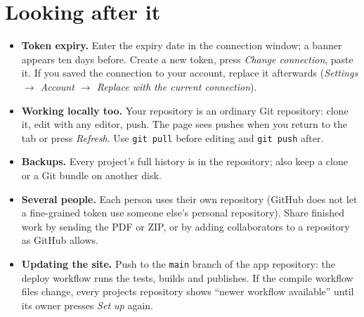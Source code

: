 \documentclass[11pt,a4paper]{article}
\newcommand{\fpath}[1]{\texttt{\small #1}}
\begin{document}
\section{Looking after it}
\begin{itemize}
  \item \textbf{Token expiry.} Enter the expiry date in the connection window; a banner appears ten days before. Create a new token, press \emph{Change connection}, paste it. If you saved the connection to
        your account, replace it afterwards (\emph{Settings $\rightarrow$ Account $\rightarrow$ Replace with the current connection}).
  \item \textbf{Working locally too.} Your repository is an ordinary Git repository: clone it, edit with any editor, push. The page sees pushes when you return to the tab or press \emph{Refresh}.
        Use \fpath{git pull} before editing and \fpath{git push} after.
  \item \textbf{Backups.} Every project's full history is in the repository; also keep a clone or a Git bundle on another disk.
  \item \textbf{Several people.} Each person uses their own repository (GitHub does not let a fine-grained token use someone else's personal repository). Share finished work by sending the PDF or ZIP, or
        by adding collaborators to a repository as GitHub allows.
  \item \textbf{Updating the site.} Push to the \fpath{main} branch of the app repository: the deploy workflow runs the tests, builds and publishes. If the compile workflow files change, every projects
        repository shows ``newer workflow available'' until its owner presses \emph{Set up} again.
\end{itemize}
\end{document}
